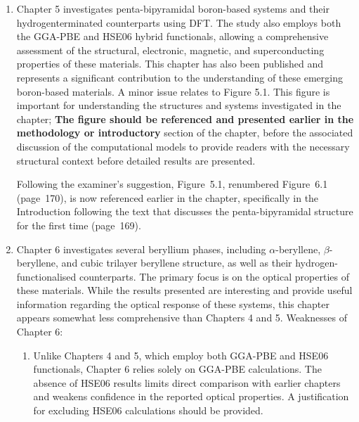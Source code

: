 \documentclass[12pt,a4paper]{article}
\newenvironment{reply}{\par\medskip\color{replyblue}}{\par\medskip}
\begin{document}
\begin{enumerate}[leftmargin=*]
\item Chapter 5 investigates penta-bipyramidal boron-based systems and their hydrogenterminated counterparts using DFT. The study also employs both the GGA-PBE and HSE06 hybrid functionals, allowing a comprehensive assessment of the structural, electronic, magnetic, and superconducting properties of these materials. This chapter has also been published and represents a significant contribution to the understanding of these emerging boron-based materials. A minor issue relates to Figure 5.1. This figure is important for understanding the structures and systems investigated in the chapter; \textbf{The figure should be referenced and presented earlier in the methodology or introductory} section of the chapter, before the associated discussion of the computational models to provide readers with the necessary structural context before detailed results are presented.

\begin{reply}
Following the examiner's suggestion, Figure~5.1, renumbered Figure~6.1 (page~170), is now referenced earlier in the chapter, specifically in the Introduction following the text that discusses the penta-bipyramidal structure for the first time (page~169).
\end{reply}

\item Chapter 6 investigates several beryllium phases, including $\alpha$-beryllene, $\beta$-beryllene, and cubic trilayer beryllene structure, as well as their hydrogen-functionalised counterparts. The primary focus is on the optical properties of these materials. While the results presented are interesting and provide useful information regarding the optical response of these systems, this chapter appears somewhat less comprehensive than Chapters 4 and 5. Weaknesses of Chapter 6:

\begin{enumerate}[label=\arabic*.,leftmargin=*]

\item Unlike Chapters 4 and 5, which employ both GGA-PBE and HSE06 functionals, Chapter 6 relies solely on GGA-PBE calculations. The absence of HSE06 results limits direct comparison with earlier chapters and weakens confidence in the reported optical properties. A justification for excluding HSE06 calculations should be provided.


\end{enumerate}
\end{enumerate}
\end{document}
